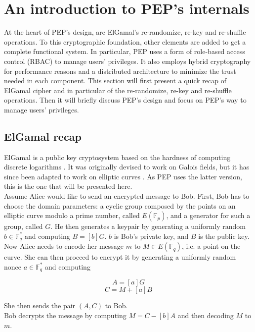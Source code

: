 \documentclass{report}
\begin{document}
\section{An introduction to PEP's internals}
At the heart of PEP's design, are ElGamal's re-randomize, re-key and re-shuffle operations. To this cryptographic foundation, other elements are added to get a complete functional system. In
particular, PEP uses a form of role-based access control (RBAC)\cite{rbac} to manage users' privileges. It also employs hybrid cryptography for performance reasons and a
distributed architecture to minimize the trust needed in each component. This section will first present a quick recap of ElGamal cipher and in particular of the re-randomize, re-key and re-shuffle
operations. Then it will briefly discuss PEP's design and focus on PEP's way to manage users' privileges.

\subsection{ElGamal recap}
ElGamal is a public key cryptosystem based on the hardness of computing discrete logarithms \cite{elgamal}. It was originally devised to work on Galois fields, but it has since
been adapted to work on elliptic curves \cite{elliptic-elgamal}. As PEP uses the latter version, this is the one that will be presented here.\\
Assume Alice would like to send an encrypted message to Bob. First, Bob has to choose the domain parameters: a cyclic group composed by the points on an elliptic curve modulo a
prime number, called $E(\mathds{F}_p)$, and a generator for such a group, called $G$. He then generates a keypair by generating a uniformly random $b \in \mathds{F}^*_q$ and computing
$B=[b]G$. $b$ is Bob's private key, and $B$ is the public key.\\
Now Alice needs to encode her message $m$ to $M \in E(\mathds{F}_q)$, i.e. a point on the curve. She can then proceed to encrypt it by generating a uniformly random nonce $a \in
\mathds{F}^*_q$ and computing

$$A=[a]G$$
$$C=M+[a]B$$

She then sends the pair $(A, C)$ to Bob. \\
Bob decrypts the message by computing $M=C-[b]A$ and then decoding $M$ to $m$.
\end{document}
